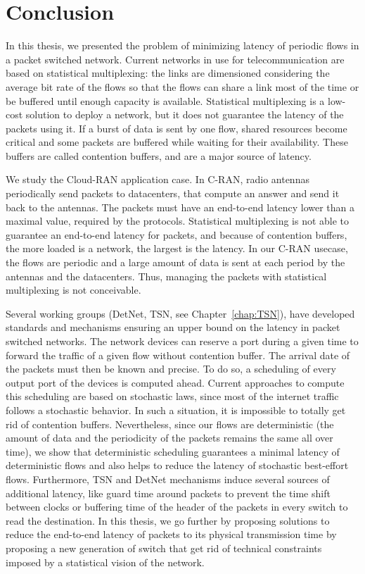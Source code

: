 
\chapter*{Conclusion}
\label{chap:concl}

In this thesis, we presented the problem of minimizing latency of periodic flows in a packet switched network. Current networks in use for telecommunication are based on statistical multiplexing: the links are dimensioned considering the average bit rate of the flows so that the flows can share a link most of the time or be buffered until enough capacity is available. Statistical multiplexing is a low-cost solution to deploy a network, but it does not guarantee the latency of the packets using it. If a burst of data is sent by one flow, shared resources become critical and some packets are buffered while waiting for their availability. These buffers are called contention buffers, and are a major source of latency.

We study the Cloud-RAN application case. In C-RAN, radio antennas periodically send packets to datacenters, that compute an answer and send it back to the antennas. The packets must have an end-to-end latency lower than a maximal value, required by the protocols. Statistical multiplexing is not able to guarantee an end-to-end latency for packets, and because of contention buffers, the more loaded is a network, the largest is the latency. In our C-RAN usecase, the flows are periodic and a large amount of data is sent at each period by the antennas and the datacenters. Thus, managing the packets with statistical multiplexing is not conceivable.

Several working groups (DetNet, TSN, see Chapter~\ref{chap:TSN}), have developed standards and mechanisms ensuring an upper bound on the latency in packet switched networks. The network devices can reserve a port during a given time to forward the traffic of a given flow without contention buffer. The arrival date of the packets must then be known and precise. To do so, a scheduling of every output port of the devices is computed ahead. Current approaches to compute this scheduling are based on stochastic laws, since most of the internet traffic follows a stochastic behavior. In such a situation, it is impossible to totally get rid of contention buffers. Nevertheless, since our flows are deterministic (the amount of data and the periodicity of the packets remains the same all over time), we show that deterministic scheduling guarantees a minimal latency of deterministic flows and also helps to reduce the latency of stochastic best-effort flows. 
Furthermore, TSN and DetNet mechanisms induce several sources of additional latency, like guard time around packets to prevent the time shift between clocks or buffering time of the header of the packets in every switch to read the destination. In this thesis, we go further by proposing solutions to reduce the end-to-end latency of packets to its physical transmission time by proposing a new generation of switch that get rid of technical constraints imposed by a statistical vision of the network.


